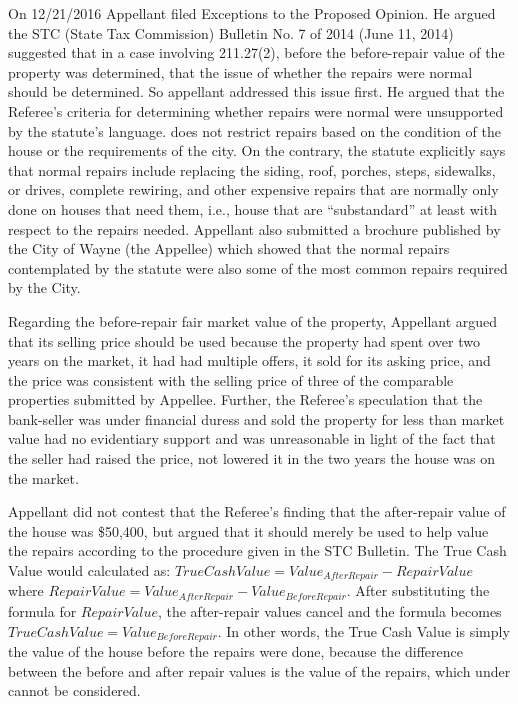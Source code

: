 On 12/21/2016 Appellant filed Exceptions to the Proposed Opinion. He argued the STC (State Tax Commission) Bulletin No. 7 of 2014 (June 11, 2014) suggested that in a case involving 211.27(2), before the before-repair value of the property was determined, that the issue of whether the repairs were normal should be determined. So appellant addressed this issue first. He argued that the Referee's criteria for determining whether repairs were normal were unsupported by the statute's language.  does not restrict repairs based on the condition of the house or the requirements of the city. On the contrary, the statute explicitly says that normal repairs include replacing the siding, roof, porches, steps, sidewalks, or drives, complete rewiring, and other expensive repairs that are normally only done on houses that need them, i.e., house that are ``substandard'' at least with respect to the repairs needed. Appellant also submitted a brochure published by the City of Wayne (the Appellee) which showed that the normal repairs contemplated by the statute were also some of the most common repairs required by the City. 

Regarding the before-repair fair market value of the property, Appellant argued that its selling price should be used because the property had spent over two years on the market, it had had multiple offers, it sold for its asking price, and the price was consistent with the selling price of three of the comparable properties submitted by Appellee. Further, the Referee's speculation that the bank-seller was under financial duress and sold the property for less than market value had no evidentiary support and was unreasonable in light of the fact that the seller had raised the price, not lowered it in the two years the house was on the market.

Appellant did not contest that the Referee's finding that the after-repair value of the house was \$50,400, but argued that it should merely be used to help value the repairs according to the procedure given in the STC Bulletin. The True Cash Value would calculated as: 
$TrueCashValue = Value_{AfterRepair} - RepairValue$
where $RepairValue = Value_{AfterRepair} - Value_{BeforeRepair}$. After substituting the formula for $RepairValue$, the after-repair values cancel and the formula becomes $TrueCashValue = Value_{BeforeRepair}$. In other words, the True Cash Value is simply the value of the house before the repairs were done, because the difference between the before and after repair values is the value of the repairs, which under  cannot be considered.

